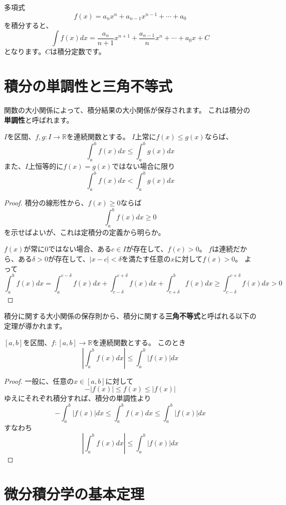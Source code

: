 \begin{example}
  多項式
  \[
    f(x)=a_nx^n+a_{n-1}x^{n-1}+\cdots+a_0
  \]
  を積分すると、
  \[
    \int f(x)dx=\frac{a_n}{n+1}x^{n+1}+\frac{a_{n-1}}{n}x^n+\cdots+a_0x+C
  \]
  となります。$C$は積分定数です。
\end{example}

\section{積分の単調性と三角不等式}

関数の大小関係によって、積分結果の大小関係が保存されます。
これは積分の\textbf{単調性}と呼ばれます。
\begin{theorem}
  $I$を区間、$f,g:I\to\mathbb{R}$を連続関数とする。
  $I$上常に$f(x)\leq g(x)$ならば、
  \[
    \int_a^b f(x)dx\leq\int_a^b g(x)dx
  \]
  また、$I$上恒等的に$f(x)=g(x)$ではない場合に限り
  \[
    \int_a^b f(x)dx<\int_a^b g(x)dx
  \]
\end{theorem}
\begin{proof}
  積分の線形性から、$f(x)\geq0$ならば
  \[
    \int_a^bf(x)dx\geq0
  \]
  を示せばよいが、これは定積分の定義から明らか。

  $f(x)$が常に0ではない場合、ある$c\in I$が存在して、$f(c)>0$。
  $f$は連続だから、ある$\delta>0$が存在して、$|x-c|<\delta$を満たす任意の$x$に対して$f(x)>0$。
  よって
  \[
    \int_a^bf(x)dx=\int_a^{c-\delta}f(x)dx+\int_{c-\delta}^{c+\delta}f(x)dx+\int_{c+\delta}^bf(x)dx\geq\int_{c-\delta}^{c+\delta}f(x)dx>0
  \]
\end{proof}

積分に関する大小関係の保存則から、積分に関する\textbf{三角不等式}と呼ばれる以下の定理が導かれます。
\begin{corollary}
  $[a,b]$を区間、$f:[a,b]\to\mathbb{R}$を連続関数とする。
  このとき
  \[
    \left|\int_a^b f(x)dx\right|\leq\int_a^b |f(x)|dx
  \]
\end{corollary}
\begin{proof}
  一般に、任意の$x\in[a,b]$に対して
  \[
    -|f(x)|\leq f(x)\leq |f(x)|
  \]
  ゆえにそれぞれ積分すれば、積分の単調性より
  \[
    -\int_a^b|f(x)|dx\leq\int_a^bf(x)dx\leq\int_a^b|f(x)|dx
  \]
  すなわち
  \[
    \left|\int_a^b f(x)dx\right|\leq\int_a^b |f(x)|dx
  \]
\end{proof}

\section{微分積分学の基本定理}

